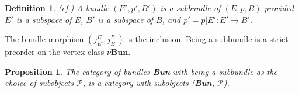 \documentclass{amsart}
\theoremstyle{plain}
\newtheorem{prop}{Proposition}
\newtheorem{defn}{Definition}
\begin{document}
	\begin{defn}(cf.\cite{Dale}) \label{subbundle}
	A bundle $(E',p',B')$ is a subbundle of $(E,p,B)$ provided $E'$ is a subspace of $E$, $B'$ is a subspace of $B$, and $p' = p|E' : E' \rightarrow B'$.
\end{defn}
\begin{center}
\end{center}
The bundle morphism $(j_{E'}^{E}, j_{B'}^{B})$ is the inclusion. Being a subbundle is a strict preorder on the vertex class $\nu \textbf{Bun}$.
\begin{prop}
	 The category of bundles \textbf{Bun} with being a subbundle as the choice of subobjects $\mathcal {P}$, is a category with subobjects (\textbf{Bun}, $\mathcal {P}$).
\end{prop}
\end{document}

